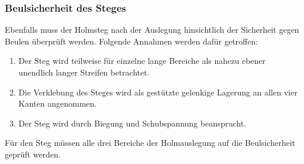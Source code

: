 \subsubsection{Beulsicherheit des Steges}
\label{Beulsicherheit Steg}
Ebenfalls muss der Holmsteg nach der Auslegung hinsichtlich der Sicherheit gegen Beulen überprüft werden. Folgende Annahmen werden dafür getroffen:\\
\begin{enumerate}
	\item Der Steg wird teilweise für einzelne lange Bereiche als nahezu ebener unendlich langer Streifen betrachtet.
	\item Die Verklebung des Steges wird als gestützte gelenkige Lagerung an allen vier Kanten angenommen.
	\item Der Steg wird durch Biegung und Schubspannung beansprucht.
\end{enumerate}
Für den Steg müssen alle drei Bereiche der Holmauslegung auf die Beulsicherheit geprüft werden. \\

